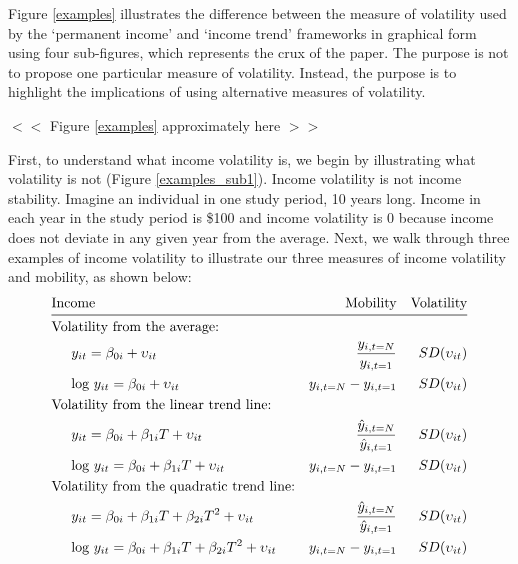 \documentclass[12pt]{article}
\begin{document}
Figure \ref{examples} illustrates the difference between the measure of volatility used by the `permanent income' and `income trend' frameworks in graphical form using four sub-figures, which represents the crux of the paper. The purpose is not to propose one particular measure of volatility. Instead, the purpose is to highlight the implications of using alternative measures of volatility.
\begin{center}
$<<$ Figure \ref{examples} approximately here $>>$ 
\end{center}
First, to understand what income volatility is, we begin by illustrating what volatility is not (Figure \ref{examples_sub1}). Income volatility is not income stability. Imagine an individual in one study period, 10 years long. Income in each year in the study period is \$100 and income volatility is 0 because income does not deviate in any given year from the average. Next, we walk through three examples of income volatility to illustrate our three measures of income volatility and mobility, as shown below:
\begin{align}
& \text{Income} & \text{Mobility} &&\text{Volatility} \nonumber \\\midrule
& \mbox{Volatility from the average:} \nonumber \\
& \hspace{5mm}y_{it} = \beta_{0i} + \upsilon_{it} & \frac{y_{i,t=N}}{y_{i,t=1}} && SD(\upsilon_{it}) \label{average} \\
& \hspace{5mm} \mbox{log }y_{it} = \beta_{0i} + \upsilon_{it} & y_{i,t=N} - y_{i,t=1} && SD(\upsilon_{it}) \nonumber \\
& \mbox{Volatility from the linear trend line:} \nonumber \\ 
& \hspace{5mm}y_{it} = \beta_{0i} + \beta_{1i}T + \upsilon_{it} & \frac{\hat{y}_{i,t=N}}{\hat{y}_{i,t=1}} && SD(\upsilon_{it}) \label{linear} \\
& \hspace{5mm} \mbox{log }y_{it} = \beta_{0i} + \beta_{1i}T + \upsilon_{it} & y_{i,t=N} - y_{i,t=1} && SD(\upsilon_{it}) \nonumber \\
& \mbox{Volatility from the quadratic trend line:} \nonumber \\ 
& \hspace{5mm}y_{it} = \beta_{0i} + \beta_{1i}T + \beta_{2i}T^2 + \upsilon_{it} &  \frac{\hat{y}_{i,t=N}}{\hat{y}_{i,t=1}} && SD(\upsilon_{it}) \label{curvilinear} \\
& \hspace{5mm} \mbox{log }y_{it} = \beta_{0i} + \beta_{1i}T + \beta_{2i}T^2 + \upsilon_{it} & y_{i,t=N} - y_{i,t=1} && SD(\upsilon_{it}) \nonumber
\end{align}
\end{document}
